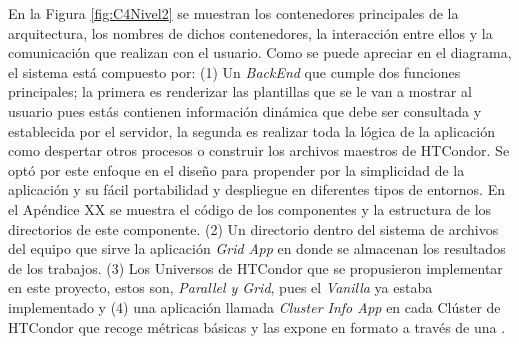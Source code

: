 En la Figura \ref{fig:C4Nivel2} se muestran los contenedores principales de la arquitectura, los nombres de dichos contenedores, la interacción entre ellos y la comunicación que realizan con el usuario. Como se puede apreciar en el diagrama, el sistema está compuesto por: (1) Un \textit{BackEnd} que cumple dos funciones principales; la primera es renderizar las plantillas que se le van a mostrar al usuario pues estás contienen información dinámica que debe ser consultada y establecida por el servidor, la segunda es realizar toda la lógica de la aplicación como despertar otros procesos o construir los archivos maestros de HTCondor. Se optó por este enfoque en el diseño para propender por la simplicidad de la aplicación y su fácil portabilidad y despliegue en diferentes tipos de entornos. En el Apéndice XX se muestra el código de los componentes y la estructura de los directorios de este componente. (2) Un directorio dentro del sistema de archivos del equipo que sirve la aplicación \textit{Grid App} en donde se almacenan los resultados de los trabajos. (3) Los Universos de HTCondor que se propusieron implementar en este proyecto, estos son, \textit{Parallel y Grid}, pues el \textit{Vanilla} ya estaba implementado y (4) una aplicación llamada \textit{Cluster Info App} en cada Clúster de HTCondor que recoge métricas básicas y las expone en formato \JSON a través de una \API.

